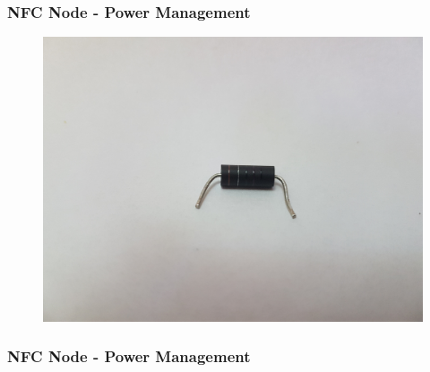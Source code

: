 \begin{frame}[fragile]
\frametitle{NFC Node - Power Management} 
\begin{figure}
  \centering
  \qquad
\end{figure}
\begin{figure}
  \centering
  \includegraphics[width=.3\textwidth]{images/NFC9.jpg}
\end{figure}
\end{frame}

\begin{frame}[fragile]
\frametitle{NFC Node - Power Management} 
\begin{figure}
  \centering
  \qquad
\end{figure}
\end{frame}


